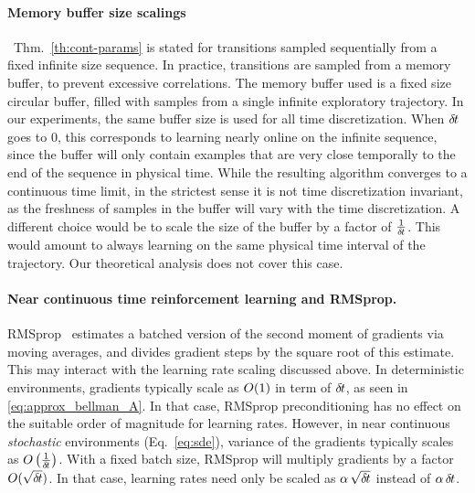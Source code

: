 \paragraph{Memory buffer size scalings}~Thm.~\ref{th:cont-params} is stated for
transitions sampled sequentially from a fixed infinite size sequence. In practice,
transitions are sampled from a memory buffer, to prevent excessive correlations.
The memory buffer used is a fixed size circular buffer, filled
with samples from a single infinite exploratory trajectory. In
our experiments, the same buffer size is used for all time discretization. When
${\delta\hspace{-.1em}t}$ goes to $0$, this corresponds to learning nearly online on the
infinite sequence, since the buffer will only contain examples that are very
close temporally to the end of the sequence in physical time.  While the resulting
algorithm converges to a continuous time limit, in the strictest sense it is not
time discretization invariant, as the freshness of samples in the buffer will
vary with the time discretization.
A different choice would be to scale the size of the buffer by a factor of
$\frac{1}{{\delta\hspace{-.1em}t}}$. This would amount to always learning on the same physical time interval of
the trajectory. Our theoretical analysis does not cover this case.

\paragraph{Near continuous time reinforcement learning and RMSprop.} RMSprop~\cite{rmsprop}
estimates a batched version of the second moment of gradients via moving
averages, and divides gradient steps by the square root of this estimate.
This may interact with the learning rate scaling discussed above. In
deterministic environments, gradients typically scale as $O(1)$ in
term of ${\delta\hspace{-.1em}t}$, as seen in \eqref{eq:approx_bellman_A}.  In that case, RMSprop
preconditioning has no effect on the suitable order of magnitude for learning
rates. However, in near continuous \emph{stochastic} environments (Eq.~\ref{eq:sde}), variance of the gradients typically scales as
$O\left(\frac{1}{{\delta\hspace{-.1em}t}}\right)$. With a fixed batch size,
RMSprop will multiply gradients by a factor $O(\sqrt{{\delta\hspace{-.1em}t}})$. In
that case,
learning rates need only be scaled as $\alpha \,\sqrt{{\delta\hspace{-.1em}t}}$ instead of
$\alpha \,{\delta\hspace{-.1em}t}$.

